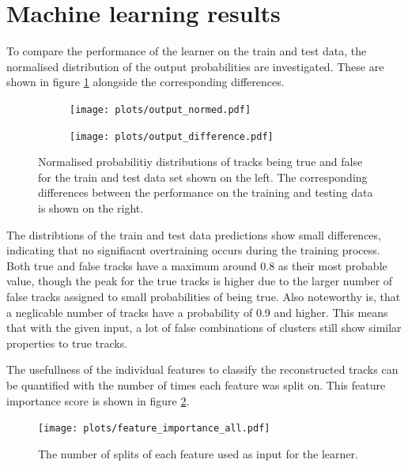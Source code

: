 \section{Machine learning results}
To compare the performance of the learner on the train and test data, the normalised distribution of the output probabilities are investigated.
These are shown in figure \ref{fig:output} alongside the corresponding differences.

\begin{figure}
  \hspace{-2.5cm}
  \begin{subfigure}{0.62\textwidth}
      \centering
      \texttt{[image: plots/output\_normed.pdf]}
  \end{subfigure}
  \begin{subfigure}{0.62\textwidth}
      \hspace{0.95cm}
      \texttt{[image: plots/output\_difference.pdf]}
  \end{subfigure}
  \caption{Normalised probabilitiy distributions of tracks being true and false for the train and test data set shown on the left.
  The corresponding differences between the performance on the training and testing data is shown on the right.}
  \label{fig:output}
\end{figure}

The distribtions of the train and test data predictions show small differences, indicating that no signifiacnt overtraining occurs during the training process.
Both true and false tracks have a maximum around 0.8 as their most probable value, though the peak for the true tracks is higher due to the larger number
of false tracks assigned to small probabilities of being true. Also noteworthy is, that a neglicable number of tracks have a probability of 0.9 and higher. This means that
with the given input, a lot of false combinations of clusters still show similar properties to true tracks.

The usefullness of the individual features to classify the reconstructed tracks can be quantified with the number of times each feature was split on.
This feature importance score is shown in figure \ref{fig:importance}.

\begin{figure}
  \centering
  \texttt{[image: plots/feature\_importance\_all.pdf]}
  \caption{The number of splits of each feature used as input for the learner.}
  \label{fig:importance}
\end{figure}

